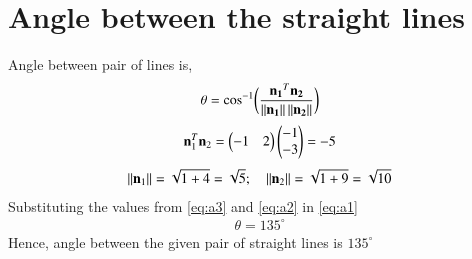 \documentclass[journal,12pt,twocolumn]{IEEEtran}
\begin{document}
\section{Angle between the straight lines}
Angle between pair of lines is,
\begin{align}
    \theta = \cos^{-1}\biggl(\frac{\mathbf{n_1}^T\mathbf{n_2}}{\left\lVert\mathbf{n_1}\right\rVert\left\lVert\mathbf{n_2}\right\rVert}\biggr) \label{eq:a1}
\end{align}
\begin{align}
    \mathbf{n}_1^T\mathbf{n}_2 = \begin{pmatrix}-1 & 2\end{pmatrix}\begin{pmatrix}-1 \\ -3\end{pmatrix} = -5 \label{eq:a2} 
\end{align}
\begin{align}
    \left\lVert\mathbf{n}_1\right\rVert=\sqrt{1+4}=\sqrt{5}; \quad \left\lVert\mathbf{n}_2\right\rVert=\sqrt{1+9}=\sqrt{10} \label{eq:a3}
\end{align}
Substituting the values from \eqref{eq:a3} and \eqref{eq:a2} in \eqref{eq:a1}
\begin{align}
    \theta = 135^{\circ}
\end{align}
Hence, angle between the given pair of straight lines is $135^{\circ}$
\end{document}
